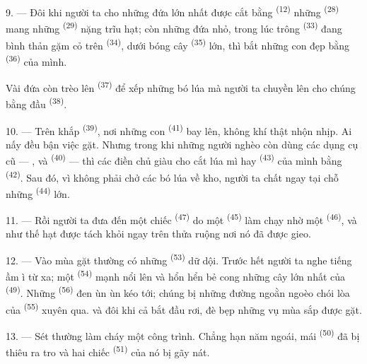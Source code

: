 9. --- Đôi khi người ta cho những đứa lớn nhất được cắt bằng 
\textsuperscript{(12)} những  \textsuperscript{(28)} mang những
 \textsuperscript{(29)} nặng trĩu hạt; còn những đứa nhỏ, trong lúc trông
 \textsuperscript{(33)} đang bình thản gặm cỏ trên 
\textsuperscript{(34)}, dưới bóng cây  \textsuperscript{(35)} lớn, thì bắt
những con  đẹp bằng  \textsuperscript{(36)} của mình.

Vài đứa còn trèo lên  \textsuperscript{(37)} để xếp những bó lúa mà người ta
chuyền lên cho chúng bằng đầu  \textsuperscript{(38)}.

10. --- Trên khắp  \textsuperscript{(39)}, nơi những con  \textsuperscript{(41)} bay lên, không khí thật nhộn nhịp. Ai nấy đều bận việc
gặt. Nhưng trong khi những người nghèo còn dùng các dụng cụ cũ — ,
 và  \textsuperscript{(40)} — thì các điền chủ giàu cho cắt
lúa mì hay  \textsuperscript{(43)} của mình bằng 
\textsuperscript{(42)}. Sau đó, vì không phải chở các bó lúa về kho, người ta chất ngay
tại chỗ những  \textsuperscript{(44)} lớn.

11. --- Rồi người ta đưa đến một chiếc  \textsuperscript{(47)} do một
 \textsuperscript{(45)} làm chạy nhờ một  \textsuperscript{(46)}, và như thế hạt được tách khỏi  ngay trên thửa
ruộng nơi nó đã được gieo.

\VUsaut{5.0mm}
\VUsaut{3.4mm}

12. --- Vào mùa gặt thường có những  \textsuperscript{(53)} dữ dội.
Trước hết người ta nghe tiếng  ầm ì từ xa; một 
\textsuperscript{(54)} mạnh nổi lên và hổn hển bẻ cong những cây lớn nhất của
 \textsuperscript{(49)}. Những 
\textsuperscript{(56)} đen ùn ùn kéo tới; chúng bị những đường ngoằn ngoèo chói lòa của
 \textsuperscript{(55)} xuyên qua.  và đôi khi cả
 bắt đầu rơi, đè bẹp những vụ mùa sắp được gặt.

13. --- Sét thường làm cháy một công trình. Chẳng hạn năm ngoái, mái  \textsuperscript{(50)} đã bị thiêu ra tro và hai chiếc 
\textsuperscript{(51)} của nó bị gãy nát.

